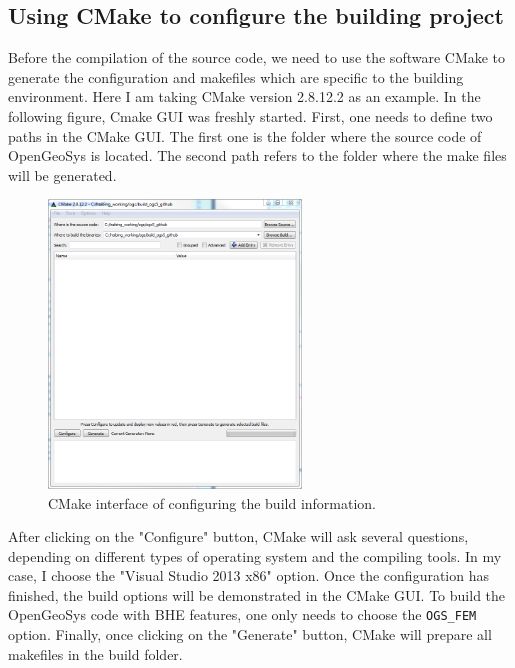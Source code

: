 \subsection{Using CMake to configure the building project}
Before the compilation of the source code, we need to use the software CMake to generate the configuration and makefiles which are specific to the building environment. Here I am taking CMake version 2.8.12.2 as an example. In the following figure, Cmake GUI was freshly started. First, one needs to define two paths in the CMake GUI. The first one is the folder where the source code of OpenGeoSys is located. The second path refers to the folder where the make files will be generated. 
\begin{figure}
\begin{center}
\includegraphics[width=0.6\textwidth]{fig/cmake_initial}
\end{center}
\caption{CMake interface of configuring the build information. }
\label{fig:cmake_initial}
\end{figure}
After clicking on the "Configure" button, CMake will ask several questions, depending on different types of operating system and the compiling tools. In my case, I choose the "Visual Studio 2013 x86" option. Once the configuration has finished, the build options will be demonstrated in the CMake GUI. To build the OpenGeoSys code with BHE features, one only needs to choose the \texttt{OGS\_FEM} option. Finally, once clicking on the "Generate" button, CMake will prepare all makefiles in the build folder. 
